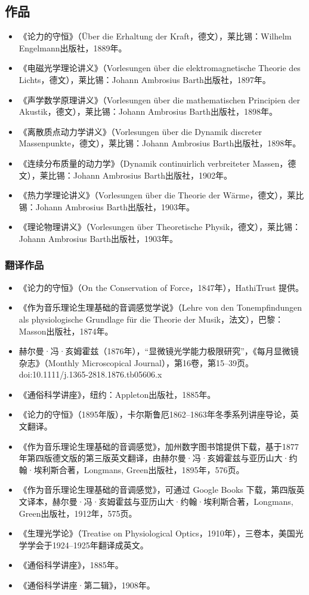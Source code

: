 \subsection{作品}
\begin{itemize}
\item 《论力的守恒》（Über die Erhaltung der Kraft，德文），莱比锡：Wilhelm Engelmann出版社，1889年。
\item 《电磁光学理论讲义》（Vorlesungen über die elektromagnetische Theorie des Lichts，德文），莱比锡：Johann Ambrosius Barth出版社，1897年。
\item 《声学数学原理讲义》（Vorlesungen über die mathematischen Principien der Akustik，德文），莱比锡：Johann Ambrosius Barth出版社，1898年。
\item 《离散质点动力学讲义》（Vorlesungen über die Dynamik discreter Massenpunkte，德文），莱比锡：Johann Ambrosius Barth出版社，1898年。
\item 《连续分布质量的动力学》（Dynamik continuirlich verbreiteter Massen，德文），莱比锡：Johann Ambrosius Barth出版社，1902年。
\item 《热力学理论讲义》（Vorlesungen über die Theorie der Wärme，德文），莱比锡：Johann Ambrosius Barth出版社，1903年。
\item 《理论物理讲义》（Vorlesungen über Theoretische Physik，德文），莱比锡：Johann Ambrosius Barth出版社，1903年。
\end{itemize}
\subsubsection{翻译作品}
\begin{itemize}
\item 《论力的守恒》（On the Conservation of Force，1847年），HathiTrust 提供。
\item 《作为音乐理论生理基础的音调感觉学说》（Lehre von den Tonempfindungen als physiologische Grundlage für die Theorie der Musik，法文），巴黎：Masson出版社，1874年。
\item 赫尔曼·冯·亥姆霍兹（1876年），“显微镜光学能力极限研究”，《每月显微镜杂志》（Monthly Microscopical Journal），第16卷，第15–39页。doi:10.1111/j.1365-2818.1876.tb05606.x
\item 《通俗科学讲座》，纽约：Appleton出版社，1885年。
\item 《论力的守恒》（1895年版），卡尔斯鲁厄1862–1863年冬季系列讲座导论，英文翻译。
\item 《作为音乐理论生理基础的音调感觉》，加州数字图书馆提供下载，基于1877年第四版德文版的第三版英文翻译，由赫尔曼·冯·亥姆霍兹与亚历山大·约翰·埃利斯合著，Longmans, Green出版社，1895年，576页。
\item 《作为音乐理论生理基础的音调感觉》，可通过 Google Books 下载，第四版英文译本，赫尔曼·冯·亥姆霍兹与亚历山大·约翰·埃利斯合著，Longmans, Green出版社，1912年，575页。
\item 《生理光学论》（Treatise on Physiological Optics，1910年），三卷本，美国光学学会于1924–1925年翻译成英文。
\item 《通俗科学讲座》，1885年。
\item 《通俗科学讲座·第二辑》，1908年。
\end{itemize}